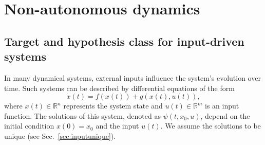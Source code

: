 \documentclass{article}
\theoremstyle{definition} \newtheorem{definition}{Definition}
\theoremstyle{remark} \newtheorem{remark}{Remark}
\newcommand{\reals}{\mathbb{R}}
\newcounter{ct}
\begin{document}





\section{Non-autonomous dynamics}\label{sec:nonautonomous}


\subsection{Target and hypothesis class for input-driven systems}\label{sec:inputdriven}
In many dynamical systems, external inputs influence the system's evolution over time. Such systems can be described by differential equations of the form
\begin{equation}\label{eq:inputdriven}
\dot x(t) = f(x(t)) + g(x(t),u(t)),
\end{equation}
where $x(t)\in\reals^n$  represents the system state and $u(t)\in\reals^m$ is an input function.
%
The solutions of this system, denoted as $\psi(t,x_0,u)$, depend on the initial condition $x(0) = x_0$  and the input $u(t)$.
We assume the solutions to be unique (see Sec.~\ref{sec:inputunique}).






%

\end{document}
